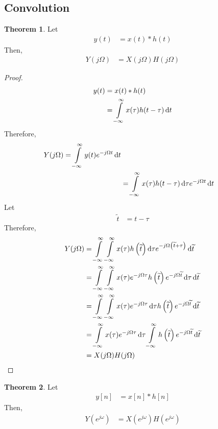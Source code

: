 \documentclass[titlepage, fleqn, a4paper, 12pt, twoside]{article}
\theoremstyle{definition}
\theoremstyle{theorem}
\newtheorem{theorem}{Theorem}
\renewcommand{\tilde}{\widetilde}
\begin{document}
\subsection{Convolution}

\begin{theorem}
	Let
	\begin{align*}
		y(t) &= x(t) \ast h(t)
	\end{align*}
	Then,
	\begin{align*}
		Y(j \Omega) &= X(j \Omega) H(j \Omega)
	\end{align*}
\end{theorem}

\begin{proof}
	\begin{align*}
		y(t) &= x(t) \ast h(t)\\
		&= \int\limits_{-\infty}^{\infty} x(\tau) h(t - \tau) \dif t
	\end{align*}
	Therefore,
	\begin{align*}
		Y(j \Omega) = \int\limits_{-\infty}^{\infty} y(t) e^{-j \Omega t} \dif t\\
		&= \int\limits_{-\infty}^{\infty} x(\tau) h(t - \tau) \dif \tau e^{-j \Omega t} \dif t
	\end{align*}
	Let
	\begin{align*}
		\tilde{t} &= t - \tau
	\end{align*}
	Therefore,
	\begin{align*}
		Y(j \Omega) &= \int\limits_{-\infty}^{\infty} \int\limits_{-\infty}^{\infty} x(\tau) h\left( \tilde{t} \right) \dif \tau e^{-j \Omega \left( \tilde{t} + \tau \right)} \dif \tilde{t}\\
		&= \int\limits_{-\infty}^{\infty} \int\limits_{-\infty}^{\infty} x(\tau) e^{-j \Omega \tau} h\left( \tilde{t} \right) e^{-j \Omega \tilde{t}} \dif \tau \dif \tilde{t}\\
		&= \int\limits_{-\infty}^{\infty} \int\limits_{-\infty}^{\infty} x(\tau) e^{-j \Omega \tau} \dif \tau h\left( \tilde{t} \right) e^{-j \Omega \tilde{t}} \dif \tilde{t}\\
		&= \int\limits_{-\infty}^{\infty} x(\tau) e^{-j \Omega \tau} \dif \tau \int\limits_{-\infty}^{\infty} h\left( \tilde{t} \right) e^{-j \Omega \tilde{t}} \dif \tilde{t}\\
		&= X(j \Omega) H(j \Omega)
	\end{align*}
\end{proof}

\begin{theorem}
	Let
	\begin{align*}
		y[n] &= x[n] \ast h[n]
	\end{align*}
	Then,
	\begin{align*}
		Y\left( e^{j \omega} \right) &= X\left( e^{j \omega} \right) H\left( e^{j \omega} \right)
	\end{align*}
\end{theorem}
\end{document}
